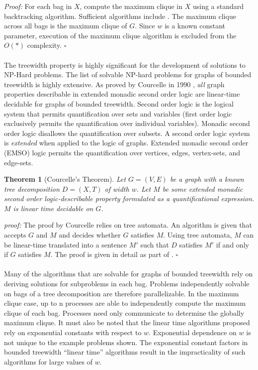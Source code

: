 \documentclass[12pt,conference]{IEEEtran}
\theoremstyle{plain}
\newtheorem{theorem}{Theorem}
\begin{document}
\textit{Proof:} For each bag in $X$, compute the maximum clique in $X$ using a standard backtracking algorithm. Sufficient algorithms include \cite{max-clique-exp-time}. The maximum clique across all bags is the maximum clique of $G$. Since $w$ is a known constant parameter, execution of the maximum clique algorithm is excluded from the $O(*)$ complexity. $\square$
\\
\\
The treewidth property is highly significant for the development of solutions to NP-Hard problems. The list of solvable NP-hard problems for graphs of bounded treewidth is highly extensive. As proved by Courcelle in 1990 \cite{courcelle-original}, \textit{all} graph properties describable in extended monadic second order logic are linear-time decidable for graphs of bounded treewidth. Second order logic is the logical system that permits quantification over sets and variables (first order logic exclusively permits the quantification over individual variables). Monadic second order logic disallows the quantification over subsets. A second order logic system is \textit{extended} when applied to the logic of graphs. Extended monadic second order (EMSO) logic permits the quantification over vertices, edges, vertex-sets, and edge-sets.

\begin{theorem}[Courcelle's Theorem]
  Let $G=(V,E)$ be a graph with a known tree decomposition $D=(X,T)$ of width $w$. Let $M$ be some extended monadic second order logic-describable property formulated as a quantificational expression. $M$ is linear time decidable on $G$.
\end{theorem}

\textit{proof:} 
  The proof by Courcelle relies on tree automata. An algorithm is given that accepts $G$ and $M$ and decides whether $G$ satisfies $M$. Using tree automata, $M$ can be linear-time translated into a sentence $M'$ such that $D$ satisfies $M'$ if and only if $G$ satisfies $M$. The proof is given in detail as part of \cite{courcelle-original}. $\square$
\\
\\
Many of the algorithms that are solvable for graphs of bounded treewidth rely on deriving solutions for subproblems in each bag. Problems independently solvable on bags of a tree decomposition are therefore parallelizable. In the maximum clique case, up to n processes are able to independently compute the maximum clique of each bag. Processes need only communicate to determine the globally maximum clique. It must also be noted that the linear time algorithms proposed rely on exponential constants with respect to $w$. Exponential dependence on $w$ is not unique to the example problems shown. The exponential constant factors in bounded treewidth ``linear time'' algorithms result in the impracticality of such algorithms for large values of $w$.
\end{document}

